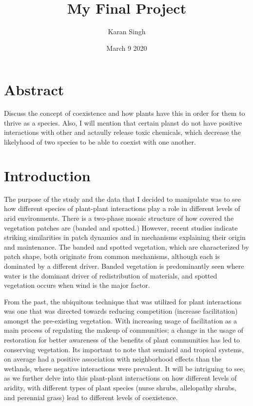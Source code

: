 \documentclass[letterpaper]{article}
\title{My Final Project}
\author{Karan Singh}
\date{March 9 2020}
\begin{document}
\maketitle
\section*{Abstract}
Discuss the concept of coexistence and how plants have this in order for them to thrive as a species. Also, I will mention that certain planst do not have positive interactions with other and actaully release toxic chemicals, which decrease the likelyhood of two species to be able to coexist with one another.
\newpage
\tableofcontents


\newpage
\section{Introduction}
The purpose of the study and the data that I decided to manipulate was to see how different species of plant-plant interactions play a role in different levels of arid environments. There is a two-phase mosaic structure of how covered the vegetation patches are (banded and spotted.) However, recent studies indicate striking similarities in patch dynamics and in mechanisms explaining their origin and maintenance. The banded and spotted vegetation, which are characterized by patch shape, both originate from common mechanisms, although each is dominated by a different driver. Banded vegetation is predominantly seen where water is the dominant driver of redistribution of materials, and spotted vegetation occurs when wind is the major factor.

From the past, the ubiquitous technique that was utilized for plant interactions was one that was directed towards reducing competition (increase facilitation) amongst the pre-existing vegetation. With increasing usage of facilitation as a main process of regulating the makeup of communities; a change in the usage of restoration for better awareness of the benefits of plant communities has led to conserving vegetation. Its important to note that semiarid and tropical systems, on average had a positive association with neighborhood effects than the wetlands, where negative interactions were prevalent. It will be intriguing to see, as we further delve into this plant-plant interactions on how different levels of aridity, with different types of plant species (nurse shrubs, allelopathy shrubs, and perennial grass) lead to different levels of coexistence.
\end{document}
